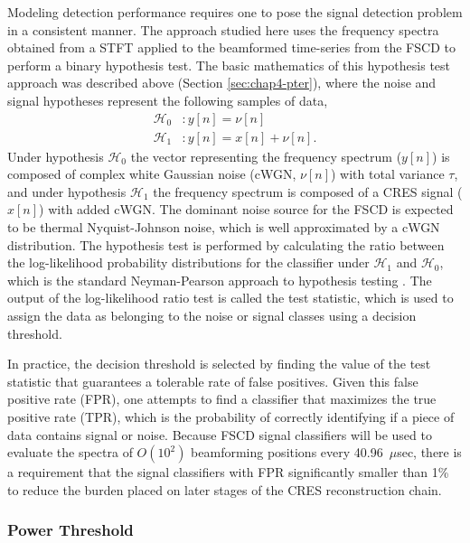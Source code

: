 Modeling detection performance requires one to pose the signal detection problem in a consistent manner. The approach studied here uses the frequency spectra obtained from a STFT applied to the beamformed time-series from the FSCD to perform a binary hypothesis test. The basic mathematics of this hypothesis test approach was described above (Section \ref{sec:chap4-pter}), where the noise and signal hypotheses represent the following samples of data,
\begin{align}
    \mathcal{H}_0 & : y[n]=\nu[n]\\
    \mathcal{H}_1 & : y[n]=x[n]+\nu[n].
\end{align}
Under hypothesis $\mathcal{H}_0$ the vector representing the frequency spectrum ($y[n]$) is composed of complex white Gaussian noise (cWGN, $\nu[n]$) with total variance $\tau$, and under hypothesis $\mathcal{H}_1$ the frequency spectrum is composed of a CRES signal ($x[n]$) with added cWGN. The dominant noise source for the FSCD is expected to be thermal Nyquist-Johnson noise, which is well approximated by a cWGN distribution. The hypothesis test is performed by calculating the ratio between the log-likelihood probability distributions for the classifier under $\mathcal{H}_1$ and $\mathcal{H}_0$, which is the standard Neyman-Pearson approach to hypothesis testing \cite{detection_theory}. The output of the log-likelihood ratio test is called the test statistic, which is used to assign the data as belonging to the noise or signal classes using a decision threshold. 

In practice, the decision threshold is selected by finding the value of the test statistic that guarantees a tolerable rate of false positives. Given this false positive rate (FPR), one attempts to find a classifier that maximizes the true positive rate (TPR), which is the probability of correctly identifying if a piece of data contains signal or noise. Because FSCD signal classifiers will be used to evaluate the spectra of $O(10^2)$ beamforming positions every 40.96~$\mu$sec, there is a requirement that the signal classifiers with FPR significantly smaller than 1\% to reduce the burden placed on later stages of the CRES reconstruction chain.%

\subsubsection{Power Threshold}

